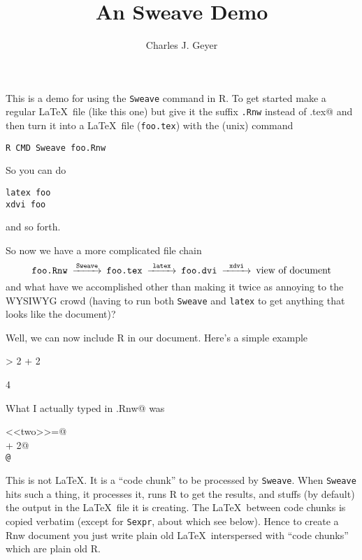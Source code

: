 \documentclass{article}
\begin{document}
\title{An Sweave Demo}
\author{Charles J. Geyer}
\maketitle

This is a demo for using the \texttt{Sweave} command in R.  To
get started make a regular \LaTeX\ file (like this one) but
give it the suffix \texttt{.Rnw} instead of \verb@.tex@ and then
turn it into a \LaTeX\ file (\texttt{foo.tex}) with the (unix) command
\begin{verbatim}
R CMD Sweave foo.Rnw
\end{verbatim}
So you can do
\begin{verbatim}
latex foo
xdvi foo
\end{verbatim}
and so forth.

So now we have a more complicated file chain
$$
\begin{CD}
   \texttt{foo.Rnw}
   @>\texttt{Sweave}>>
   \texttt{foo.tex}
   @>\texttt{latex}>>
   \texttt{foo.dvi}
   @>\texttt{xdvi}>>
   \text{view of document}
\end{CD}
$$
and what have we accomplished other than making it twice as annoying
to the WYSIWYG crowd (having to run both \texttt{Sweave} and \texttt{latex}
to get anything that looks like the document)?

Well, we can now include R in our document.  Here's a simple example
\begin{Schunk}
\begin{Sinput}
> 2 + 2
\end{Sinput}
\begin{Soutput}
[1] 4
\end{Soutput}
\end{Schunk}
What I actually typed in \verb@foo.Rnw@ was
\begin{tabbing}
\verb@<<two>>=@ \\
 + 2@ \\
\verb+@+ \\
\end{tabbing}
This is not \LaTeX.  It is a ``code chunk'' to be processed by \texttt{Sweave}.
When \texttt{Sweave} hits such a thing, it processes it, runs R to get the
results, and stuffs (by default) the output in the \LaTeX\ file it is
creating.  The \LaTeX\ between code chunks is copied verbatim (except
for \texttt{Sexpr}, about which see below).  Hence to create a Rnw document
you just write plain old \LaTeX\ interspersed with ``code chunks'' which
are plain old R.
\end{document}
